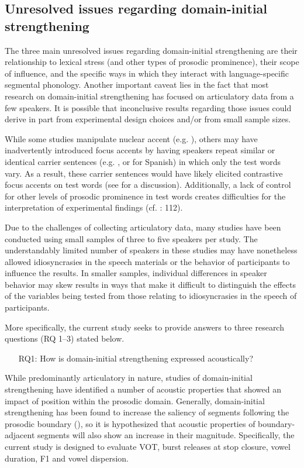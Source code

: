 \documentclass[output=paper]{langscibook}
\begin{document}
\subsection{Unresolved issues regarding domain-initial strengthening}\label{1.3}
The three main unresolved issues regarding domain-initial strengthening are their relationship to lexical stress (and other types of prosodic prominence), their scope of influence, and the specific ways in which they interact with language-specific segmental phonology. Another important caveat lies in the fact that most research on domain-initial strengthening has focused on articulatory data from a few speakers. It is possible that inconclusive results regarding those issues could derive in part from experimental design choices and/or from small sample sizes. 

While some studies manipulate nuclear accent (e.g. \citealt{ckk17}), others may have inadvertently introduced focus accents by having speakers repeat similar or identical carrier sentences (e.g. \citealt{l01}, or \citealt{p14} for Spanish) in which only the test words vary. As a result, these carrier sentences would have likely elicited contrastive focus accents on test words (see \citealt{rg17} for a discussion). Additionally, a lack of control for other levels of prosodic prominence in test words creates difficulties for the interpretation of experimental findings (cf. \citealt{Fougeron2001}: 112).

Due to the challenges of collecting articulatory data, many studies have been conducted using small samples of three to five speakers per study. The understandably limited number of speakers in these studies may have nonetheless allowed idiosyncrasies in the speech materials or the behavior of participants to influence the results. In smaller samples, individual differences in speaker behavior may skew results in ways that make it difficult to distinguish the effects of the variables being tested from those relating to idiosyncrasies in the speech of participants. 

More specifically, the current study seeks to provide answers to three research questions (RQ 1--3) stated below.


\begin{enumerate}
    \item[RQ1:] How is domain-initial strengthening expressed acoustically?
\end{enumerate}



While predominantly articulatory in nature, studies of domain-initial strengthening have identified a number of acoustic properties that showed an impact of position within the prosodic domain. Generally, domain-initial strengthening has been found to increase the saliency of segments following the prosodic boundary (\citealt{c16}), so it is hypothesized that acoustic properties of boundary-adjacent segments will also show an increase in their magnitude. Specifically, the current study is designed to evaluate VOT, burst releases at stop closure, vowel duration, F1 and vowel dispersion.
\end{document}
